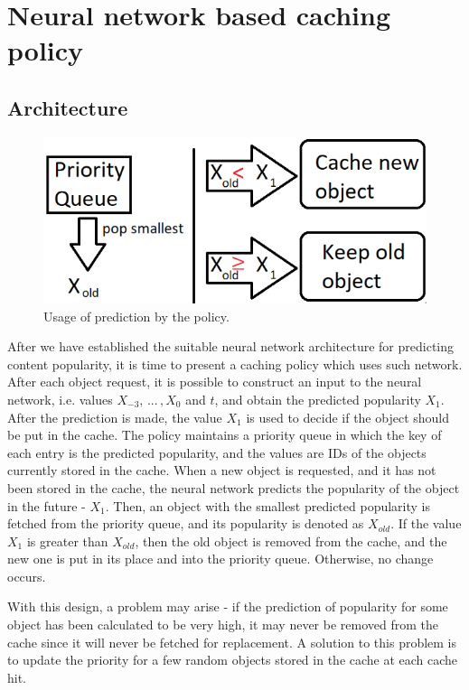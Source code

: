 \section{Neural network based caching policy} \label{caching_policy}

\subsection{Architecture} \label{architecture}

\begin{figure}[b!]
	\centering
	\includegraphics[width=0.75\linewidth]{pics/cache2.png}
	\caption{Usage of prediction by the policy.}
	\label{fig:cache2}
\end{figure}

After we have established the suitable neural network architecture for predicting content popularity, it is time to present a caching policy which uses such network. After each object request, it is possible to construct an input to the neural network, i.e. values $X_{-3}, \, ... \, , X_{0}$ and $t$, and obtain the predicted popularity $X_{1}$. After the prediction is made, the value $X_1$ is used to decide if the object should be put in the cache. The policy maintains a priority queue in which the key of each entry is the predicted popularity, and the values are IDs of the objects currently stored in the cache. When a new object is requested, and it has not been stored in the cache, the neural network predicts the popularity of the object in the future - $X_1$. Then, an object with the smallest predicted popularity is fetched from the priority queue, and its popularity is denoted as $X_{old}$. If the value $X_1$ is greater than $X_{old}$, then the old object is removed from the cache, and the new one is put in its place and into the priority queue. Otherwise, no change occurs.

With this design, a problem may arise - if the prediction of popularity for some object has been calculated to be very high, it may never be removed from the cache since it will never be fetched for replacement. A solution to this problem is to update the priority for a few random objects stored in the cache at each cache hit.

